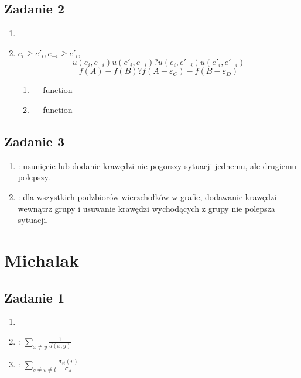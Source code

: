 \documentclass{article}
\newcommand\wassterm[1]{{\color{blue}{#1}}}
\begin{document}
\subsection{Zadanie 2}
\begin{enumerate}
    \item
        \wassterm{pozytywne efekty zewnętrzne}
    \item
        $e_i \geq e'_i, e_{-i} \geq e'_i$,
        $$
        u(e_i, e_{-i})
        u(e'_i, e_{-i})
        ?
        u(e_i, e'_{-i})
        u(e'_i, e'_{-i})
        $$
        $$
        f(A) - f(B) 
        ? 
        f(A - \varepsilon_C) - f(B - \varepsilon_D)
        $$
        \begin{enumerate}
            \item
                \wassterm{strategiczna substytutywność}---\wassterm{concave} function
            \item
                \wassterm{strategiczna komplementarność}---\wassterm{convex} function
        \end{enumerate}
\end{enumerate}

\subsection{Zadanie 3}
\begin{enumerate}
 \item
     \wassterm{pairwise stable}: usunięcie lub dodanie krawędzi nie pogorszy
        sytuacji jednemu, ale drugiemu polepszy.
 \item
     \wassterm{strongly stable}: dla wszystkich podzbiorów wierzchołków w
        grafie, dodawanie krawędzi wewnątrz grupy i usuwanie krawędzi
        wychodących z grupy nie polepsza sytuacji.
\end{enumerate}

\section{Michalak}

\subsection{Zadanie 1}
\begin{enumerate}
    \item
        \wassterm{degree centrality}
    \item
        \wassterm{closeness centrality}:
        $\sum_{x\neq y}{\frac{1}{d(x,y)}}$
    \item
        \wassterm{betweenness centrality}:
        $\sum_{s\neq v \neq t} \frac{\sigma_{st}(v)}{\sigma_{st}}$

\end{enumerate}
\end{document}
